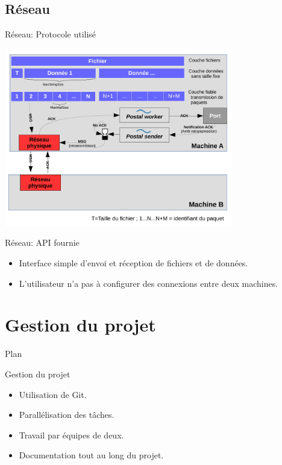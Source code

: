 \documentclass{beamer}
\begin{document}
\subsection{Réseau}

\begin{frame}{Réseau: Protocole utilisé}
        \begin{center}
			\includegraphics[width=10cm]{schema_reseau.pdf}
		\end{center}
\end{frame}

\begin{frame}{Réseau: API fournie}
	\begin{itemize}
        \item Interface simple d'envoi et réception de fichiers et de données.
        \item L'utilisateur n'a pas à configurer des connexions entre deux machines.
    \end{itemize}
\end{frame}

\section{Gestion du projet}
\begin{frame}{Plan}
    \tableofcontents[currentsection]
\end{frame}

\begin{frame}{Gestion du projet}
    \begin{itemize}
        \item Utilisation de Git.
        \item Parallélisation des tâches.
        \item Travail par équipes de deux.
        \item Documentation tout au long du projet.
    \end{itemize}
\end{frame}
\end{document}
